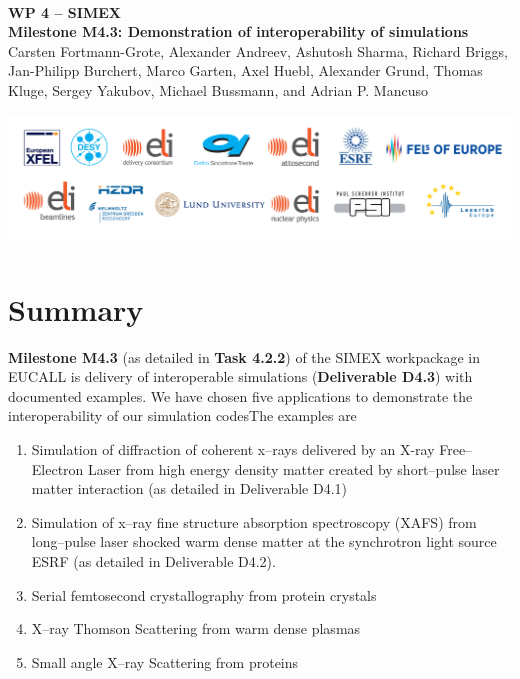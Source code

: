 \documentclass[12pt]{scrartcl}
\begin{document}
\makeatletter
\begin{titlepage}
\thispagestyle{scrheadings}
\begin{center}
  $~$\\
  \vspace{2cm}
  \Huge{\textbf{WP 4 -- SIMEX\\[1cm]
    Milestone M4.3: Demonstration of interoperability of simulations%
  }}\\
  \vspace{2cm}
  \large{Carsten Fortmann-Grote, Alexander Andreev, Ashutosh Sharma, Richard
    Briggs, Jan-Philipp Burchert, Marco Garten, Axel Huebl, Alexander Grund,
  Thomas Kluge, Sergey Yakubov, Michael Bussmann, and Adrian P. Mancuso}
  \vspace{1cm}
  \date{\today}
\end{center}
\vfill%
\includegraphics[width=\textwidth]{figures/PartnerLogos_2017}
\normalfont
\end{titlepage}
\makeatother
%
\tableofcontents
%
\section{Summary}\label{sec:summary}
\textbf{Milestone M4.3} (as detailed in \textbf{Task 4.2.2}) of the SIMEX
workpackage in EUCALL is delivery of interoperable simulations
(\textbf{Deliverable D4.3}) with documented examples. We have chosen five
applications to demonstrate the interoperability of our simulation codesThe examples are
\begin{enumerate}
  \item Simulation of diffraction of coherent x--rays delivered by an X-ray
    Free--Electron Laser from high energy density matter created by short--pulse
    laser matter interaction (as detailed in Deliverable D4.1)
  \item Simulation of x--ray fine structure absorption spectroscopy (XAFS) from long--pulse laser
    shocked warm dense matter at the synchrotron light source ESRF (as detailed
    in Deliverable D4.2).
  \item Serial femtosecond crystallography from protein crystals
  \item X--ray Thomson Scattering from warm dense plasmas
  \item Small angle X--ray Scattering from proteins
\end{enumerate}
\end{document}
